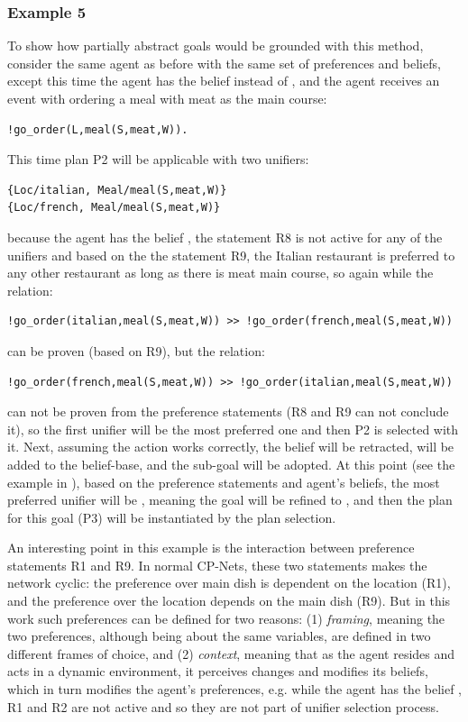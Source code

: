 \subsubsection*{Example 5}
To show how partially abstract goals would be grounded with this method, consider the same agent as before with the same set of preferences and beliefs, except this time the agent has the belief  instead of , and the agent receives an event with ordering a meal with meat as the main course:
\begin{verbatim}
!go_order(L,meal(S,meat,W)). 
\end{verbatim}
This time plan P2 will be applicable with two unifiers:
\begin{verbatim}
{Loc/italian, Meal/meal(S,meat,W)}
{Loc/french, Meal/meal(S,meat,W)}
\end{verbatim}
because the agent has the belief , the statement R8 is not active for any of the unifiers and based on the the statement R9, the Italian restaurant is preferred to any other restaurant as long as there is meat main course, so again while the relation:
\begin{verbatim}
!go_order(italian,meal(S,meat,W)) >> !go_order(french,meal(S,meat,W))
\end{verbatim}
can be proven (based on R9), but the relation:
\begin{verbatim}
!go_order(french,meal(S,meat,W)) >> !go_order(italian,meal(S,meat,W))
\end{verbatim}
can not be proven from the preference statements (R8 and R9 can not conclude it), so the first unifier will be the most preferred one and then P2 is selected with it. Next, assuming the  action works correctly, the belief  will be retracted,  will be added to the belief-base, and the sub-goal  will be adopted. At this point (see the example in \cite{Boutilier2004}), based on the preference statements and agent's beliefs, the most preferred unifier will be , meaning the goal will be refined to , and then the plan for this goal (P3) will be instantiated by the plan selection.

An interesting point in this example is the interaction between preference statements R1 and R9. In normal CP-Nets, these two statements makes the network cyclic: the preference over main dish is dependent on the location (R1), and the preference over the location depends on the main dish (R9). But in this work such preferences can be defined for two reasons: (1) \textit{framing}, meaning the two preferences, although being about the same variables, are defined in two different frames of choice, and (2) \textit{context}, meaning that as the agent resides and acts in a dynamic environment, it perceives changes and modifies its beliefs, which in turn modifies the agent's preferences, e.g. while the agent has the belief , R1 and R2 are not active and so they are not part of unifier selection process. 

